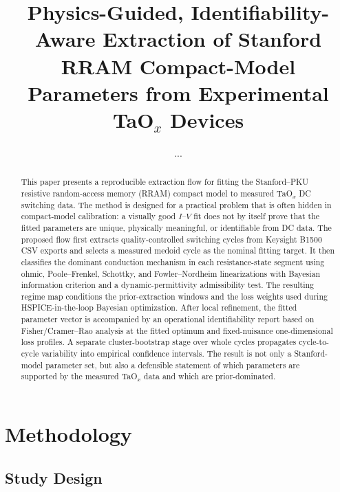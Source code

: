 \documentclass[journal]{IEEEtran}
\begin{document}
\title{Physics-Guided, Identifiability-Aware Extraction of Stanford RRAM
Compact-Model Parameters from Experimental TaO$_x$ Devices}

\author{...}
\maketitle

\begin{abstract}
This paper presents a reproducible extraction flow for fitting the
Stanford--PKU resistive random-access memory (RRAM) compact model to measured
TaO$_x$ DC switching data.  The method is designed for a practical problem
that is often hidden in compact-model calibration: a visually good
$I$--$V$ fit does not by itself prove that the fitted parameters are unique,
physically meaningful, or identifiable from DC data.  The proposed flow first
extracts quality-controlled switching cycles from Keysight B1500 CSV exports
and selects a measured medoid cycle as the nominal fitting target.  It then
classifies the dominant conduction mechanism in each resistance-state segment
using ohmic, Poole--Frenkel, Schottky, and Fowler--Nordheim linearizations
with Bayesian information criterion and a dynamic-permittivity admissibility
test.  The resulting regime map conditions the prior-extraction windows and
the loss weights used during HSPICE-in-the-loop Bayesian optimization.  After
local refinement, the fitted parameter vector is accompanied by an operational
identifiability report based on Fisher/Cramer--Rao analysis at the fitted
optimum and fixed-nuisance one-dimensional loss profiles.  A separate
cluster-bootstrap stage over whole cycles propagates cycle-to-cycle
variability into empirical confidence intervals.  The result is not only a
Stanford-model parameter set, but also a defensible statement of which
parameters are supported by the measured TaO$_x$ data and which are
prior-dominated.
\end{abstract}

\section{Methodology}

\subsection{Study Design}
\label{sec:study-design}
\end{document}
